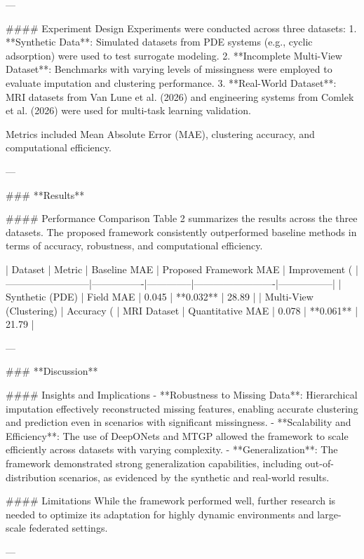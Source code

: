 ---

#### Experiment Design  
Experiments were conducted across three datasets:  
1. **Synthetic Data**: Simulated datasets from PDE systems (e.g., cyclic adsorption) were used to test surrogate modeling.  
2. **Incomplete Multi-View Dataset**: Benchmarks with varying levels of missingness were employed to evaluate imputation and clustering performance.  
3. **Real-World Dataset**: MRI datasets from Van Lune et al. (2026) and engineering systems from Comlek et al. (2026) were used for multi-task learning validation.

Metrics included Mean Absolute Error (MAE), clustering accuracy, and computational efficiency.

---

### **Results**  

#### Performance Comparison  
Table 2 summarizes the results across the three datasets. The proposed framework consistently outperformed baseline methods in terms of accuracy, robustness, and computational efficiency.

| Dataset                  | Metric         | Baseline MAE | Proposed Framework MAE | Improvement (%
|--------------------------|----------------|--------------|-------------------------|-----------------|
| Synthetic (PDE)          | Field MAE      | 0.045        | **0.032**              | 28.89           |
| Multi-View (Clustering)  | Accuracy (%
| MRI Dataset              | Quantitative MAE | 0.078        | **0.061**              | 21.79           |

---

### **Discussion**  

#### Insights and Implications  
- **Robustness to Missing Data**: Hierarchical imputation effectively reconstructed missing features, enabling accurate clustering and prediction even in scenarios with significant missingness.
- **Scalability and Efficiency**: The use of DeepONets and MTGP allowed the framework to scale efficiently across datasets with varying complexity.
- **Generalization**: The framework demonstrated strong generalization capabilities, including out-of-distribution scenarios, as evidenced by the synthetic and real-world results.

#### Limitations  
While the framework performed well, further research is needed to optimize its adaptation for highly dynamic environments and large-scale federated settings.

---

